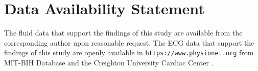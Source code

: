 \documentclass[aip,cha,reprint,nofootinbib]{revtex4-1}
\begin{document}
\section*{Data Availability Statement}
The fluid data that support the findings of this study are available from the corresponding author upon reasonable request. The ECG data that support the findings of this study are openly available in {\tt https://www.physionet.org} from MIT-BIH Database and the Creighton University Cardiac Center \cite{GoldbergerMITBIH2000}. 



\end{document}
